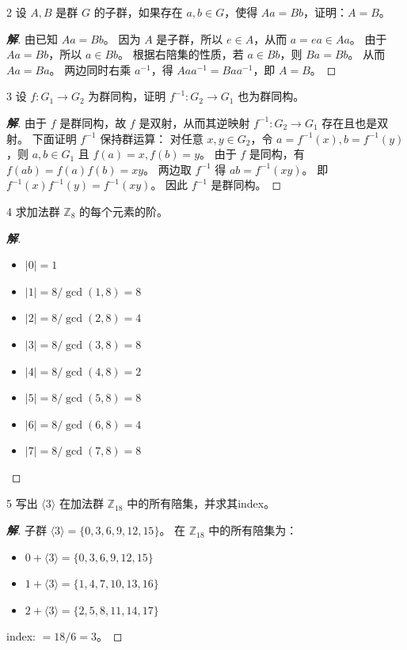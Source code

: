 \documentclass[12pt, a4paper]{article}
\newenvironment{solution}{
    \begin{proof}[\textbf{解}]
}{
    \end{proof}
}
\begin{document}
\begin{problem}{2}
    设 $A, B$ 是群 $G$ 的子群，如果存在 $a, b \in G$，使得 $Aa = Bb$，证明：$A = B$。
\end{problem}
\begin{solution}
    由已知 $Aa = Bb$。
    因为 $A$ 是子群，所以 $e \in A$，从而 $a = ea \in Aa$。
    由于 $Aa = Bb$，所以 $a \in Bb$。
    根据右陪集的性质，若 $a \in Bb$，则 $Ba = Bb$。
    从而 $Aa = Ba$。
    两边同时右乘 $a^{-1}$，得 $Aaa^{-1} = Baa^{-1}$，即 $A = B$。
\end{solution}
\begin{problem}{3}
   设 $f: G_1 \to G_2$ 为群同构，证明 $f^{-1}: G_2 \to G_1$ 也为群同构。
\end{problem}
\begin{solution}
    由于 $f$ 是群同构，故 $f$ 是双射，从而其逆映射 $f^{-1}: G_2 \to G_1$ 存在且也是双射。
    下面证明 $f^{-1}$ 保持群运算：
    对任意 $x, y \in G_2$，令 $a = f^{-1}(x), b = f^{-1}(y)$，则 $a, b \in G_1$ 且 $f(a) = x, f(b) = y$。
    由于 $f$ 是同构，有 $f(ab) = f(a)f(b) = xy$。
    两边取 $f^{-1}$ 得 $ab = f^{-1}(xy)$。
    即 $f^{-1}(x)f^{-1}(y) = f^{-1}(xy)$。
    因此 $f^{-1}$ 是群同构。
\end{solution}
\begin{problem}{4}
    求加法群 $\mathbb{Z}_8$ 的每个元素的阶。
\end{problem}
\begin{solution}
    \begin{itemize}
        \item $|0| = 1$
        \item $|1| = 8/\gcd(1,8) = 8$
        \item $|2| = 8/\gcd(2,8) = 4$
        \item $|3| = 8/\gcd(3,8) = 8$
        \item $|4| = 8/\gcd(4,8) = 2$
        \item $|5| = 8/\gcd(5,8) = 8$
        \item $|6| = 8/\gcd(6,8) = 4$
        \item $|7| = 8/\gcd(7,8) = 8$
    \end{itemize}
\end{solution}
\begin{problem}{5}
   写出 $\langle 3 \rangle$ 在加法群 $\mathbb{Z}_{18}$ 中的所有陪集，并求其index。
\end{problem}
\begin{solution}
    子群 $\langle 3 \rangle = \{0, 3, 6, 9, 12, 15\}$。
    在 $\mathbb{Z}_{18}$ 中的所有陪集为：
    \begin{itemize}
        \item $0 + \langle 3 \rangle = \{0, 3, 6, 9, 12, 15\}$
        \item $1 + \langle 3 \rangle = \{1, 4, 7, 10, 13, 16\}$
        \item $2 + \langle 3 \rangle = \{2, 5, 8, 11, 14, 17\}$
    \end{itemize}
    index: $ = 18 / 6 = 3$。
\end{solution}
\end{document}
